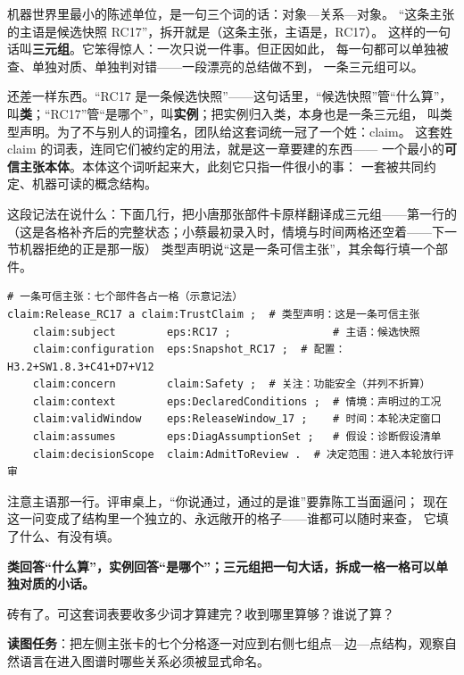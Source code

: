 机器世界里最小的陈述单位，是一句三个词的话：对象—关系—对象。
“这条主张的主语是候选快照 RC17”，拆开就是（这条主张，主语是，RC17）。
这样的一句话叫\textbf{三元组}。它笨得惊人：一次只说一件事。但正因如此，
每一句都可以单独被查、单独对质、单独判对错——一段漂亮的总结做不到，
一条三元组可以。

还差一样东西。“RC17 是一条候选快照”——这句话里，“候选快照”管“什么算”，
叫\textbf{类}；“RC17”管“是哪个”，叫\textbf{实例}；把实例归入类，本身也是一条三元组，
叫类型声明。为了不与别人的词撞名，团队给这套词统一冠了一个姓：claim。
这套姓 claim 的词表，连同它们被约定的用法，就是这一章要建的东西——
一个最小的\textbf{可信主张本体}。本体这个词听起来大，此刻它只指一件很小的事：
一套被共同约定、机器可读的概念结构。

这段记法在说什么：下面几行，把小唐那张部件卡原样翻译成三元组——第一行的（这是各格补齐后的完整状态；小蔡最初录入时，情境与时间两格还空着——下一节机器拒绝的正是那一版）
类型声明说“这是一条可信主张”，其余每行填一个部件。

\nopagebreak[4]
\begin{codebox}
\begin{Verbatim}[fontsize=\small,breaklines=true,breakanywhere=true,breaksymbolleft={},breaksymbolright={}]
# 一条可信主张：七个部件各占一格（示意记法）
claim:Release_RC17 a claim:TrustClaim ;  # 类型声明：这是一条可信主张
    claim:subject        eps:RC17 ;                # 主语：候选快照
    claim:configuration  eps:Snapshot_RC17 ;  # 配置：H3.2+SW1.8.3+C41+D7+V12
    claim:concern        claim:Safety ;  # 关注：功能安全（并列不折算）
    claim:context        eps:DeclaredConditions ;  # 情境：声明过的工况
    claim:validWindow    eps:ReleaseWindow_17 ;    # 时间：本轮决定窗口
    claim:assumes        eps:DiagAssumptionSet ;   # 假设：诊断假设清单
    claim:decisionScope  claim:AdmitToReview .  # 决定范围：进入本轮放行评审
\end{Verbatim}
\end{codebox}

注意主语那一行。评审桌上，“你说通过，通过的是谁”要靠陈工当面逼问；
现在这一问变成了结构里一个独立的、永远敞开的格子——谁都可以随时来查，
它填了什么、有没有填。

\textbf{类回答“什么算”，实例回答“是哪个”；三元组把一句大话，拆成一格一格可以单独对质的小话。}

砖有了。可这套词表要收多少词才算建完？收到哪里算够？谁说了算？


\begin{noteblock}
\textbf{读图任务}：把左侧主张卡的七个分格逐一对应到右侧七组点—边—点结构，观察自然语言在进入图谱时哪些关系必须被显式命名。
\end{noteblock}

